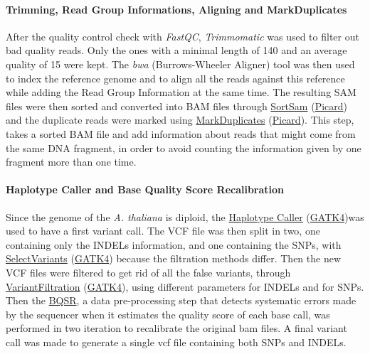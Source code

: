 \documentclass[10pt,a4paper]{article}
\begin{document}
\paragraph{Trimming, Read Group Informations, Aligning and MarkDuplicates} After the quality control check with \textit{FastQC}\cite{andrews2012}, \textit{Trimmomatic}\cite{bolger_trimmomatic:_2014} was used to filter out bad quality reads. Only the ones with a minimal length of 140 and an average quality of 15 were kept. The \textit{bwa} (Burrows-Wheeler Aligner) tool was then used to index the reference genome and to align all the reads against this reference while adding the Read Group Information at the same time. The resulting SAM files were then sorted and converted into BAM files through  \href{https://software.broadinstitute.org/gatk/documentation/tooldocs/4.0.8.0/picard_sam_SortSam.php}{SortSam} (\href{https://broadinstitute.github.io/picard/}{Picard}) and the duplicate reads were marked using  \href{https://software.broadinstitute.org/gatk/documentation/tooldocs/4.0.4.0/picard_sam_markduplicates_MarkDuplicates.php}{MarkDuplicates} (\href{https://broadinstitute.github.io/picard/}{Picard}). This step, takes a sorted BAM file and add information about reads that might come from the same DNA fragment, in order to avoid counting the information given by one fragment more than one time. 

\paragraph{Haplotype Caller and Base Quality Score Recalibration} Since the genome of the \textit{A. thaliana} is diploid, the  \href{https://software.broadinstitute.org/gatk/documentation/tooldocs/3.8-0/org_broadinstitute_gatk_tools_walkers_haplotypecaller_HaplotypeCaller.php}{Haplotype Caller} (\href{https://software.broadinstitute.org/gatk/}{GATK4})was used to have a first variant call. The VCF file was then split in two, one containing only the INDELs information, and one containing the SNPs, with  \href{https://software.broadinstitute.org/gatk/documentation/tooldocs/3.8-0/org_broadinstitute_gatk_tools_walkers_variantutils_SelectVariants.php}{SelectVariants} (\href{https://software.broadinstitute.org/gatk/}{GATK4}) because the filtration methods differ. Then the new VCF files were filtered to get rid of all the false variants, through  \href{https://software.broadinstitute.org/gatk/documentation/tooldocs/3.8-0/org_broadinstitute_gatk_tools_walkers_filters_VariantFiltration.php}{VariantFiltration} (\href{https://software.broadinstitute.org/gatk/}{GATK4}), using different parameters for INDELs and for SNPs. Then the \href{https://gatkforums.broadinstitute.org/gatk/discussion/44/base-quality-score-recalibration-bqsr}{BQSR}, a data pre-processing step that detects systematic errors made by the sequencer when it estimates the quality score of each base call, was performed in two iteration to recalibrate the original bam files. A final variant call was made to generate a single vcf file containing both SNPs and INDELs. 
\end{document}
